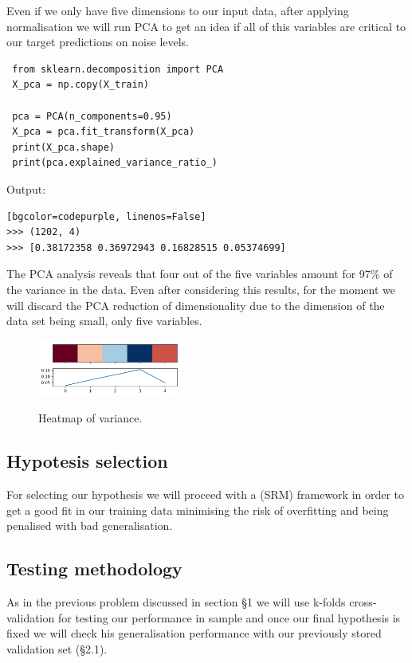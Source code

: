 \documentclass{article}
\begin{document}
Even if we only have five dimensions to our input data, after applying normalisation we will run PCA to get an idea if all of this variables are critical to our target predictions on noise levels.

\begin{verbatim}
 from sklearn.decomposition import PCA
 X_pca = np.copy(X_train)

 pca = PCA(n_components=0.95)
 X_pca = pca.fit_transform(X_pca) 
 print(X_pca.shape)
 print(pca.explained_variance_ratio_) 
\end{verbatim}

Output:
\begin{code}
\begin{verbatim}[bgcolor=codepurple, linenos=False]
>>> (1202, 4)
>>> [0.38172358 0.36972943 0.16828515 0.05374699]
\end{verbatim}
\end{code}
\indent The PCA analysis reveals that four out of the five variables amount for 97\% of the variance in the data. 
Even after considering this results, for the moment we will discard the PCA reduction of dimensionality due to the dimension of the data set being small, only five variables.

\begin{figure}[t]
    \centering
    \includegraphics[width=180px]{figures/r2}
    \label{fig:Variance-of-airfoil-data}
    \caption{Heatmap of variance.}
\end{figure}

\subsection{Hypotesis selection}
For selecting our hypothesis we will proceed with a  (SRM) framework in order to get a good fit in our training data minimising the risk of overfitting and being penalised with bad generalisation.

\subsection{Testing methodology}
As in the previous problem discussed in section \S 1 we will use k-folds cross-validation for testing our performance in sample and once our final hypothesis is fixed we will check his generalisation performance with our previously stored validation set (\S 2.1).
\end{document}
